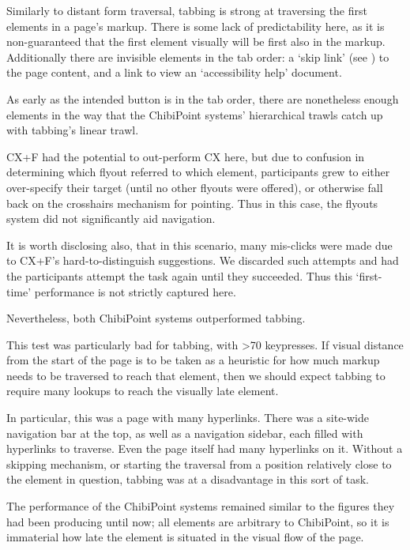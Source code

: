 \documentclass[11pt,openright,a4paper]{report}
\begin{document}
Similarly to distant form traversal, tabbing is strong at traversing the first elements in a page's markup. There is some lack of predictability here, as it is non-guaranteed that the first element visually will be first also in the markup. Additionally there are invisible elements in the tab order: a `skip link' (see ) to the page content, and a link to view an `accessibility help' document.

As early as the intended button is in the tab order, there are nonetheless enough elements in the way that the ChibiPoint systems' hierarchical trawls catch up with tabbing's linear trawl.

CX+F had the potential to out-perform CX here, but due to confusion in determining which flyout referred to which element, participants grew to either over-specify their target (until no other flyouts were offered), or otherwise fall back on the crosshairs mechanism for pointing. Thus in this case, the flyouts system did not significantly aid navigation.

It is worth disclosing also, that in this scenario, many mis-clicks were made due to CX+F's hard-to-distinguish suggestions. We discarded such attempts and had the participants attempt the task again until they succeeded. Thus this `first-time' performance is not strictly captured here.

Nevertheless, both ChibiPoint systems outperformed tabbing.

This test was particularly bad for tabbing, with >70 keypresses. If visual distance from the start of the page is to be taken as a heuristic for how much markup needs to be traversed to reach that element, then we should expect tabbing to require many lookups to reach the visually late element.

In particular, this was a page with many hyperlinks. There was a site-wide navigation bar at the top, as well as a navigation sidebar, each filled with hyperlinks to traverse. Even the page itself had many hyperlinks on it. Without a skipping mechanism, or starting the traversal from a position relatively close to the element in question, tabbing was at a disadvantage in this sort of task.

The performance of the ChibiPoint systems remained similar to the figures they had been producing until now; all elements are arbitrary to ChibiPoint, so it is immaterial how late the element is situated in the visual flow of the page.
\end{document}
